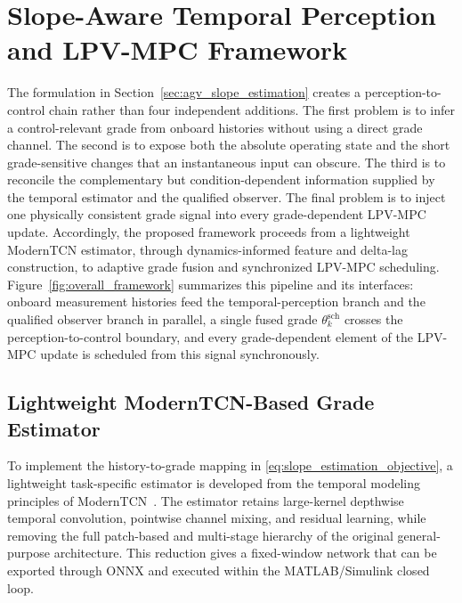 \documentclass{ieeeaccess}
\newcommand{\citep}[1]{\cite{#1}}
\begin{document}
\section{Slope-Aware Temporal Perception and LPV-MPC Framework}
\label{sec:proposed_framework}

The formulation in Section~\ref{sec:agv_slope_estimation} creates a perception-to-control chain rather than four independent additions. The first problem is to infer a control-relevant grade from onboard histories without using a direct grade channel. The second is to expose both the absolute operating state and the short grade-sensitive changes that an instantaneous input can obscure. The third is to reconcile the complementary but condition-dependent information supplied by the temporal estimator and the qualified observer. The final problem is to inject one physically consistent grade signal into every grade-dependent LPV-MPC update. Accordingly, the proposed framework proceeds from a lightweight ModernTCN estimator, through dynamics-informed feature and delta-lag construction, to adaptive grade fusion and synchronized LPV-MPC scheduling. Figure~\ref{fig:overall_framework} summarizes this pipeline and its interfaces: onboard measurement histories feed the temporal-perception branch and the qualified observer branch in parallel, a single fused grade $\theta_k^{\mathrm{sch}}$ crosses the perception-to-control boundary, and every grade-dependent element of the LPV-MPC update is scheduled from this signal synchronously.

\subsection{Lightweight ModernTCN-Based Grade Estimator}

To implement the history-to-grade mapping in \eqref{eq:slope_estimation_objective}, a lightweight task-specific estimator is developed from the temporal modeling principles of ModernTCN~\citep{Luo2024ModernTCN}. The estimator retains large-kernel depthwise temporal convolution, pointwise channel mixing, and residual learning, while removing the full patch-based and multi-stage hierarchy of the original general-purpose architecture. This reduction gives a fixed-window network that can be exported through ONNX and executed within the MATLAB/Simulink closed loop.
\end{document}
